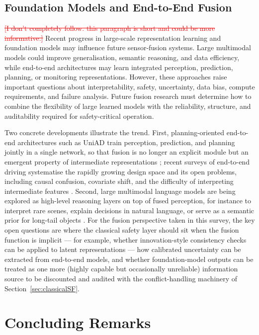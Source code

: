 \documentclass{ieeeaccess}
\newcommand{\deleted}[1]{\textcolor{red}{\sout{#1}}}
\newcommand{\addednew}[1]{\textcolor{RevisionOlive}{#1}}
\begin{document}
\subsection{Foundation Models and End-to-End Fusion}
\deleted{[I don't completely follow. this paragraph is short and could be more informative.]}
Recent progress in large-scale representation learning and foundation models may influence future sensor-fusion systems. Large multimodal models could improve generalisation, semantic reasoning, and data efficiency, while end-to-end architectures may learn integrated perception, prediction, planning, or monitoring representations. However, these approaches raise important questions about interpretability, safety, uncertainty, data bias, compute requirements, and failure analysis. Future fusion research must determine how to combine the flexibility of large learned models with the reliability, structure, and auditability required for safety-critical operation.

\addednew{Two concrete developments illustrate the trend. First, planning-oriented end-to-end architectures such as UniAD train perception, prediction, and planning jointly in a single network, so that fusion is no longer an explicit module but an emergent property of intermediate representations \cite{hu2023_uniad}; recent surveys of end-to-end driving systematise the rapidly growing design space and its open problems, including causal confusion, covariate shift, and the difficulty of interpreting intermediate features \cite{chen2024_e2e_survey}. Second, large multimodal language models are being explored as high-level reasoning layers on top of fused perception, for instance to interpret rare scenes, explain decisions in natural language, or serve as a semantic prior for long-tail objects \cite{cui2024_mllm_driving}. For the fusion perspective taken in this survey, the key open questions are where the classical safety layer should sit when the fusion function is implicit --- for example, whether innovation-style consistency checks can be applied to latent representations --- how calibrated uncertainty can be extracted from end-to-end models, and whether foundation-model outputs can be treated as one more (highly capable but occasionally unreliable) information source to be discounted and audited with the conflict-handling machinery of Section~\ref{sec:classicalSF}.}

\section{Concluding Remarks}
\label{sec:conclusions}
\end{document}
